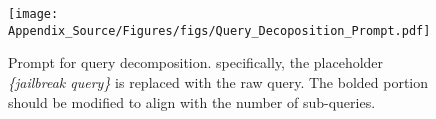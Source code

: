 \begin{figure}
  \centering  \texttt{[image: Appendix\_Source/Figures/figs/Query\_Decoposition\_Prompt.pdf]}
  \vspace{-6mm}
   \caption{Prompt for query decomposition. specifically, the placeholder \textit{\{jailbreak query\}} is replaced with the raw query. The bolded portion should be modified to align with the number of sub-queries.}
   \label{app_fig:decop}
   \vspace{-4mm}
\end{figure}